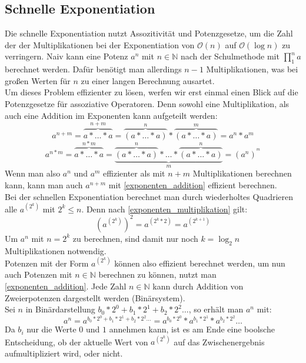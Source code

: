 \documentclass[course=erap]{aspdoc}
\begin{document}
\subsection{Schnelle Exponentiation}
Die schnelle Exponentiation nutzt Assozitivität und Potenzgesetze, um die Zahl der der Multiplikationen bei der Exponentiation von $\mathcal{O}(n)$ auf $\mathcal{O}(\log{}n)$ zu verringern. 
Naiv kann eine Potenz $a^n$ mit $n\in\mathbb{N}$ nach der Schulmethode mit \(\prod_{1}^{n} a \) berechnet werden. 
Dafür benötigt man allerdings $n-1$ Multiplikationen, was bei großen Werten für $n$ zu einer langen Berechnung ausartet.\\
Um dieses Problem effizienter zu lösen, werfen wir erst einmal einen Blick auf die Potenzgesetze für assoziative Operatoren. Denn sowohl eine Multiplikation, als auch eine Addition im Exponenten kann aufgeteilt werden:
\begin{equation}\label{exponenten_addition}
    a^{n+m} = \overbrace{a*\dots*a}^{n+m} = \overbrace{(a*\dots*a)}^n * \overbrace{(a*\dots*a)}^m = a^n * a^m
\end{equation}
\begin{equation}\label{exponenten_multiplikation}
    a^{n*m} = \overbrace{a*\dots*a}^{n*m} = \underbrace{\overbrace{(a*\dots*a)}^n*\dots*\overbrace{(a*\dots*a)}^n}_m = (a^n)^{^m}
\end{equation}
Wenn man also $a^n$ und $a^m$ effizienter als mit $n+m$ Multiplikationen berechnen kann, kann man auch $a^{n+m}$ mit \ref{exponenten_addition} effizient berechnen.\\
Bei der schnellen Exponentiation berechnet man durch wiederholtes Quadrieren alle $a^{(2^k)}$ mit $2^k \le n$. Denn nach \ref{exponenten_multiplikation} gilt:
\[ {\left( a^{(2^k)} \right)}^2 = a^{(2^k*2)} = a^{(2^{k+1})}\]
Um $a^n$ mit $n=2^k$ zu berechnen, sind damit nur noch $k=\log_2n$ Multiplikationen notwendig.
\\Potenzen mit der Form $a^{(2^k)}$ können also effizient berechnet werden, um nun auch Potenzen mit $n\in\mathbb{N}$ berechnen zu können, nutzt man \ref{exponenten_addition}. 
Jede Zahl $n\in\mathbb{N}$ kann durch Addition von Zweierpotenzen dargestellt werden (Binärsystem). \\
Sei $n$ in Binärdarstellung $b_0*2^0+b_1*2^1+b_2*2^2\dots$, so erhält man $a^n$ mit:
\[ a^n = a^{b_0*2^0+b_1*2^1+b_2*2^2\dots} = a^{b_0*2^0} * a^{b_1*2^1} * a^{b_2*2^2} \dots \]
Da $b_i$ nur die Werte $0$ und $1$ annehmen kann, ist es am Ende eine boolsche Entscheidung, ob der aktuelle Wert von $a^{(2^k)}$ auf das Zwischenergebnis aufmultipliziert wird, oder nicht.\\
\end{document}
